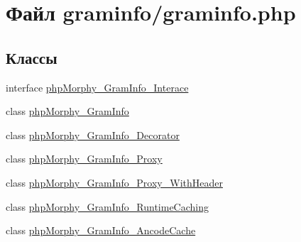 \hypertarget{graminfo_8php}{
\section{Файл graminfo/graminfo.php}
\label{graminfo_8php}
}
\subsection*{Классы}
\begin{DoxyCompactItemize}
\item 
interface \hyperlink{interfacephpMorphy__GramInfo__Interace}{phpMorphy\_\-GramInfo\_\-Interace}
\item 
class \hyperlink{classphpMorphy__GramInfo}{phpMorphy\_\-GramInfo}
\item 
class \hyperlink{classphpMorphy__GramInfo__Decorator}{phpMorphy\_\-GramInfo\_\-Decorator}
\item 
class \hyperlink{classphpMorphy__GramInfo__Proxy}{phpMorphy\_\-GramInfo\_\-Proxy}
\item 
class \hyperlink{classphpMorphy__GramInfo__Proxy__WithHeader}{phpMorphy\_\-GramInfo\_\-Proxy\_\-WithHeader}
\item 
class \hyperlink{classphpMorphy__GramInfo__RuntimeCaching}{phpMorphy\_\-GramInfo\_\-RuntimeCaching}
\item 
class \hyperlink{classphpMorphy__GramInfo__AncodeCache}{phpMorphy\_\-GramInfo\_\-AncodeCache}
\end{DoxyCompactItemize}
